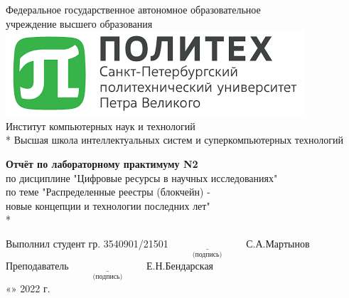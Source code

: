 \begin{titlepage}

\begin{center} %
Федеральное государственное автономное образовательное \\
учреждение высшего образования \\[0.4cm]
\includegraphics[scale=0.8]{res/SPbPU-logo} \\[0.4cm]
Институт компьютерных наук и технологий \\*
Высшая школа интеллектуальных систем и суперкомпьютерных технологий
\end{center}

\vspace{3cm}

\begin{center} %
\textbf{Отчёт по лабораторному практимуму N2}\\
по дисциплине "Цифровые ресурсы в научных исследованиях" \\
по теме "Распределенные реестры (блокчейн) - \\ новые концепции и технологии последних лет" \\*
\end{center}

\vspace{3cm}
 
\begin{flushleft}
Выполнил студент гр. 3540901/21501 \hspace{3cm} $\underset{\text{(подпись)}}{\underline{\hspace{3cm}}}$ С.А.Мартынов\\[0.5cm]
Преподаватель \hspace{7.25cm} $\underset{\text{(подпись)}}{\underline{\hspace{3cm}}}$ Е.Н.Бендарская\\[0.5cm]
\hspace{10.2cm} «\underline{\hspace{1cm}}» \underline{\hspace{3cm}} 2022 г.
\end{flushleft}


\end{titlepage}
